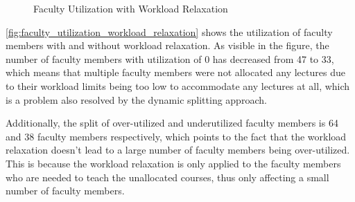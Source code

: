 \begin{figure}[H]
  \centering
  \caption{Faculty Utilization with Workload Relaxation}
  \label{fig:faculty_utilization_workload_relaxation}
\end{figure}

\autoref{fig:faculty_utilization_workload_relaxation} shows the utilization of faculty members with and without workload relaxation. As visible in the figure, the number of faculty members with utilization of 0 has decreased from 47 to 33, which means that multiple faculty members were not allocated any lectures due to their workload limits being too low to accommodate any lectures at all, which is a problem also resolved by the dynamic splitting approach.

Additionally, the split of over-utilized and underutilized faculty members is 64 and 38 faculty members respectively, which points to the fact that the workload relaxation doesn't lead to a large number of faculty members being over-utilized. This is because the workload relaxation is only applied to the faculty members who are needed to teach the unallocated courses, thus only affecting a small number of faculty members.


